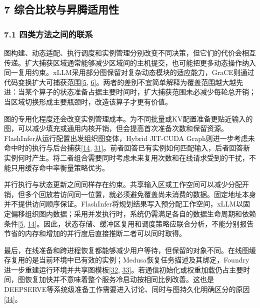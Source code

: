 \documentclass[UTF8,11pt,fontset=windows]{ctexart}
\begin{document}
\hypertarget{section-7}{%
\subsection{\texorpdfstring{\textbf{7 综合比较与昇腾适用性}}{7 综合比较与昇腾适用性}}\label{section-7}}

\hypertarget{section-7-1}{%
\subsubsection{\texorpdfstring{\textbf{7.1 四类方法之间的联系}}{7.1 四类方法之间的联系}}\label{section-7-1}}

图构建、动态适配、执行调度和实例管理分别改变不同决策，但它们的代价会相互传递。扩大捕获区域通常能够减少区域间的主机提交，也可能把更多动态操作纳入同一复用约束。xLLM采用部分图保留对复杂动态模块的适应能力，GraCE则通过代码变换扩大可捕获范围\protect\hyperlink{ref-5}{{[}5}, \protect\hyperlink{ref-6}{6{]}}。两者的差别不宜简单解释为覆盖范围越大越先进：当某个算子的状态准备占据主要时间时，扩大捕获范围未必减少每轮总开销；当区域切换形成主要瓶颈时，改造该算子才更有价值。

图的专用化程度还会改变实例管理成本。为不同批量或KV配置准备更贴近输入的图，可以减少填充或通用内核开销，但会提高首次准备次数和保留资源。FlashInfer从运行配置出发组织图变体，Hybrid JIT-CUDA Graph则进一步考虑未命中时的执行与后台捕获\protect\hyperlink{ref-14}{{[}14}, \protect\hyperlink{ref-31}{31{]}}。前者回答已有实例如何匹配输入，后者回答新实例何时产生。将二者组合需要同时考虑未来复用次数和在线请求受到的干扰，不能只用缓存命中率衡量策略优劣。

并行执行与状态更新之间同样存在约束。共享输入区或工作空间可以减少分配开销，但多个回放若访问同一位置，就必须避免覆盖尚未消费的数据。固定地址本身并不提供访问顺序保证。FlashInfer将规划结果写入预分配工作空间，xLLM以固定偏移组织图内数据；采用并发执行时，系统仍需满足各自的数据生命周期和依赖条件\protect\hyperlink{ref-5}{{[}5}, \protect\hyperlink{ref-14}{14{]}}。因此，状态存储、缓冲区复用和调度策略应联合分析，不能分别报告节省的内存和增加的并行度后直接推断二者可以同时取得。

最后，在线准备和跨进程恢复都能够减少用户等待，但保留的对象不同。在线图缓存复用的是当前环境中已有效的实例；Medusa恢复任务描述及其绑定，Foundry进一步重建运行环境并共享图模板\protect\hyperlink{ref-32}{{[}32}, \protect\hyperlink{ref-33}{33{]}}。若通信初始化或权重加载仍占主要时间，图恢复加快并不意味着整个服务冷启动按相同比例改善。这也是DEEPSERVE等系统级准备工作需要进入讨论、同时与图持久化明确区分的原因\protect\hyperlink{ref-34}{{[}34{]}}。
\end{document}
